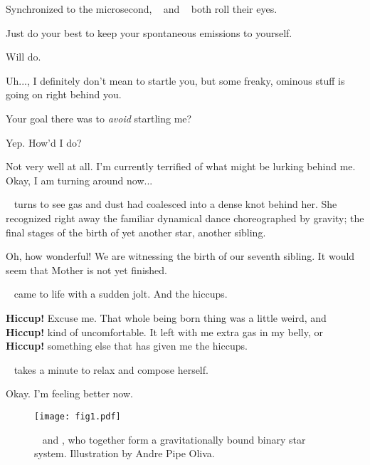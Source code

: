 \documentclass[main.tex]{subfiles}
\begin{document}
\par \nar Synchronized to the microsecond, \rmmaia~ and \rmsterope~ both roll their eyes.

\par \Maia Just do your best to keep your spontaneous emissions to yourself.

\par \Alcyone Will do. 

\par \Electra Uh...\rmmaia, I definitely don't mean to startle you, but some freaky, ominous stuff is going on right behind you.

\par \Maia Your goal there was to \textit{avoid} startling me?

\par \Electra Yep.  How'd I do?

\par \Maia Not very well at all.  I'm currently terrified of what might be lurking behind me.  Okay, I am turning around now...

\par \nar \rmmaia~ turns to see gas and dust had coalesced into a dense knot behind her.  She recognized right away the familiar dynamical dance choreographed by gravity; the final stages of the birth of yet another star, another sibling.

\par \Maia Oh, how wonderful!  We are witnessing the birth of our seventh sibling.  It would seem that Mother is not yet finished.

\par \nar \rmmerope~ came to life with a sudden jolt.  And the hiccups.  

\par \Merope \textbf{Hiccup!}  Excuse me.  That whole being born thing was a little weird, and \textbf{Hiccup!} kind of uncomfortable.  It left with me extra gas in my belly, or \textbf{Hiccup!} something else that has given me the hiccups.  

\par \nar \rmmerope~ takes a minute to relax and compose herself.

\par \Merope Okay.  I'm feeling better now.  

\begin{figure}
\texttt{[image: fig1.pdf]}
\caption{\rmmaia~ and \rmmerope, who together form a gravitationally bound binary star system.  Illustration by Andre Pipe Oliva.
\label{fig:fig1}}
\end{figure}
\end{document}
